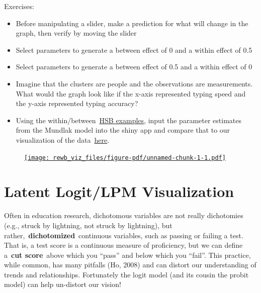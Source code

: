 \documentclass[
  letterpaper,
  DIV=11,
  numbers=noendperiod]{scrreprt}
\begin{document}
Exercises:

\begin{itemize}
\item
  Before manipulating a slider, make a prediction for what will change
  in the graph, then verify by moving the slider
\item
  Select parameters to generate a between effect of 0 and a within
  effect of 0.5
\item
  Select parameters to generate a between effect of 0.5 and a within
  effect of 0
\item
  Imagine that the clusters are people and the observations are
  measurements. What would the graph look like if the x-axis represented
  typing speed and the y-axis represented typing accuracy?
\item
  Using the
  within/between~\href{https://lmiratrix.github.io/MLM/within_v_between.html}{HSB
  examples}, input the parameter estimates from the Mundlak model into
  the shiny app and compare that to our visualization of the
  data~\href{https://lmiratrix.github.io/MLM/double_plot.html}{here}.
\end{itemize}

\begin{figure}

{\centering 

\href{https://s43dnt-josh-gilbert.shinyapps.io/s43_rewb_viz/}{\texttt{[image: rewb\_viz\_files/figure-pdf/unnamed-chunk-1-1.pdf]}}

}

\end{figure}

\hypertarget{latent-logitlpm-visualization}{%
\chapter{Latent Logit/LPM
Visualization}\label{latent-logitlpm-visualization}}

Often in education research, dichotomous variables are not really
dichotomies (e.g., struck by lightning, not struck by lightning), but
rather,~\textbf{dichotomized}~continuous variables, such as passing or
failing a test. That is, a test score is a continuous measure of
proficiency, but we can define a~\textbf{cut score}~above which you
``pass'' and below which you ``fail''. This practice, while common, has
many pitfalls (Ho, 2008) and can distort our understanding of trends and
relationships. Fortunately the logit model (and its cousin the probit
model) can help un-distort our vision!
\end{document}
